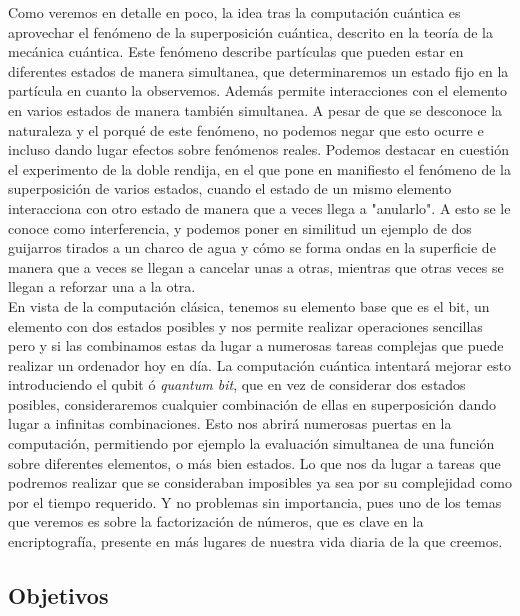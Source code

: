\documentclass[a4paper]{article}
\numberwithin{equation}{section}
\begin{document}
Como veremos en detalle en poco, la idea tras la computación cuántica es aprovechar el fenómeno de la superposición cuántica, descrito en la teoría de la mecánica cuántica. Este fenómeno describe partículas que pueden estar en diferentes estados de manera simultanea, que determinaremos un estado fijo en la partícula en cuanto la observemos. Además permite interacciones con el elemento en varios estados de manera también simultanea. A pesar de que se desconoce la naturaleza y el porqué de este fenómeno, no podemos negar que esto ocurre e incluso dando lugar efectos sobre fenómenos reales. Podemos destacar en cuestión el experimento de la doble rendija, en el que pone en manifiesto el fenómeno de la superposición de varios estados, cuando el estado de un mismo elemento interacciona con otro estado de manera que a veces llega a "anularlo". A esto se le conoce como interferencia, y podemos poner en similitud un ejemplo de dos guijarros tirados a un charco de agua y cómo se forma ondas en la superficie de manera que a veces se llegan a cancelar unas a otras, mientras que otras veces se llegan a reforzar una a la otra.\\
\linebreak
En vista de la computación clásica, tenemos su elemento base que es el bit, un elemento con dos estados posibles y nos permite realizar operaciones sencillas pero y si las combinamos estas da lugar a numerosas tareas complejas que puede realizar un ordenador hoy en día. La computación cuántica intentará mejorar esto introduciendo el qubit ó \textit{quantum bit}, que en vez de considerar dos estados posibles, consideraremos cualquier combinación de ellas en superposición dando lugar a infinitas combinaciones. Esto nos abrirá numerosas puertas en la computación, permitiendo por ejemplo la evaluación simultanea de una función sobre diferentes elementos, o más bien estados. Lo que nos da lugar a tareas que podremos realizar que se consideraban imposibles ya sea por su complejidad como por el tiempo requerido. Y no problemas sin importancia, pues uno de los temas que veremos es sobre la factorización de números, que es clave en la encriptografía, presente en más lugares de nuestra vida diaria de la que creemos.

\subsection{Objetivos}
\end{document}
